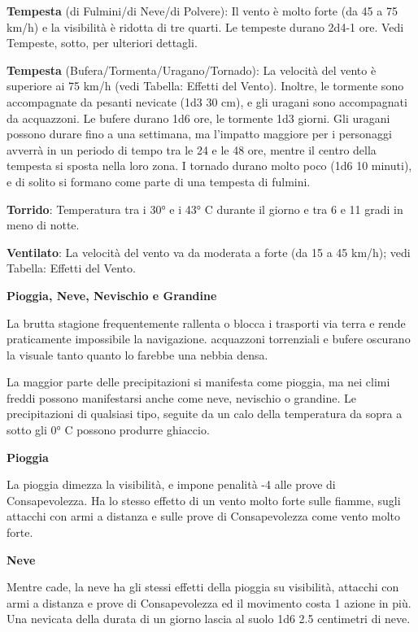 \documentclass[a4paper,11pt,twoside,openany]{book}
\begin{document}
{\textbf{Tempesta} (di Fulmini/di Neve/di Polvere): Il vento è molto forte (da 45 a 75 km/h) e la visibilità è ridotta di tre quarti. Le tempeste durano 2d4-1 ore. Vedi Tempeste, sotto, per ulteriori dettagli.

\textbf{Tempesta} (Bufera/Tormenta/Uragano/Tornado): La velocità del vento è superiore ai 75 km/h (vedi Tabella: Effetti del Vento). Inoltre, le tormente sono accompagnate da pesanti nevicate (1d3 \texttimes{} 30 cm), e gli uragani sono accompagnati da acquazzoni. Le bufere durano 1d6 ore, le tormente 1d3 giorni. Gli uragani possono durare fino a una settimana, ma l'impatto maggiore per i personaggi avverrà in un periodo di tempo tra le 24 e le 48 ore, mentre il centro della tempesta si sposta nella loro zona. I tornado durano molto poco (1d6 \texttimes{} 10 minuti), e di solito si formano come parte di una tempesta di fulmini.

\textbf{Torrido}: Temperatura tra i 30° e i 43° C durante il giorno e tra 6 e 11 gradi in meno di notte.

\textbf{Ventilato}: La velocità del vento va da moderata a forte (da 15 a 45 km/h); vedi Tabella: Effetti del Vento.

\textbf{Pioggia, Neve, Nevischio e Grandine}

La brutta stagione frequentemente rallenta o blocca i trasporti via terra e rende praticamente impossibile la navigazione. acquazzoni torrenziali e bufere oscurano la visuale tanto quanto lo farebbe una nebbia densa.

La maggior parte delle precipitazioni si manifesta come pioggia, ma nei climi freddi possono manifestarsi anche come neve, nevischio o grandine. Le precipitazioni di qualsiasi tipo, seguite da un calo della temperatura da sopra a sotto gli 0° C possono produrre ghiaccio.

\textbf{Pioggia}

La pioggia dimezza la visibilità, e impone penalità -4 alle prove di Consapevolezza. Ha lo stesso effetto di un vento molto forte sulle fiamme, sugli attacchi con armi a distanza e sulle prove di Consapevolezza come vento molto forte.

\textbf{Neve}

Mentre cade, la neve ha gli stessi effetti della pioggia su visibilità, attacchi con armi a distanza e prove di Consapevolezza ed il movimento costa 1 azione in più. Una nevicata della durata di un giorno lascia al suolo 1d6 \texttimes{} 2.5 centimetri di neve.

}
\end{document}
